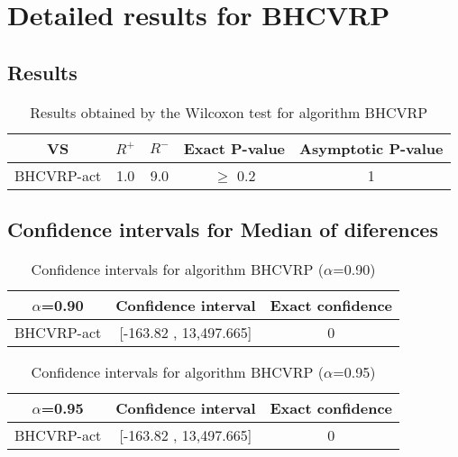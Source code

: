 \documentclass[a4paper,10pt]{article}
\begin{document}
 \clearpage 


\section{Detailed results for BHCVRP}


\subsection{Results}

\begin{table}[!htp]
\centering\small
\begin{tabular}{
|c|c|c|c|c|}
\hline
 VS & $R^{+}$ & $R^{-}$ & Exact P-value & Asymptotic P-value \\ \hline 
BHCVRP-act & 1.0 & 9.0 & $\geq$ 0.2 & 1\\ \hline 

\end{tabular}
\caption{Results obtained by the Wilcoxon test for algorithm BHCVRP}
\end{table}

\subsection{Confidence intervals for Median of diferences}

\begin{table}[!htp]
\centering\small
\begin{tabular}{
|c|c|c|}
\hline
 $\alpha$=0.90 & Confidence interval & Exact confidence \\ \hline 
BHCVRP-act & [-163.82 , 13,497.665] & 0\\ \hline 

\end{tabular}
\caption{Confidence intervals for algorithm BHCVRP ($\alpha$=0.90)}
\end{table}
\begin{table}[!htp]
\centering\small
\begin{tabular}{
|c|c|c|}
\hline
 $\alpha$=0.95 & Confidence interval & Exact confidence \\ \hline 
BHCVRP-act & [-163.82 , 13,497.665] & 0\\ \hline 

\end{tabular}
\caption{Confidence intervals for algorithm BHCVRP ($\alpha$=0.95)}
\end{table}

 \clearpage 
\end{document}
